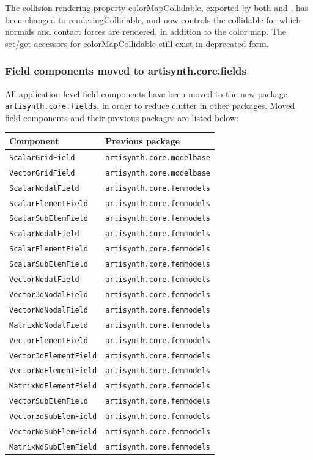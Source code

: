 \documentclass{article}
\begin{document}
The collision rendering property {\sf colorMapCollidable}, exported by both
 and
, has been
changed to {\sf renderingCollidable}, and now controls the collidable
for which normals and contact forces are rendered, in addition to the
color map. The set/get accessors for {\sf colorMapCollidable} still
exist in deprecated form.

\subsubsection{Field components moved to artisynth.core.fields}

All application-level field components have been moved to the new
package {\tt artisynth.core.fields}, in order to reduce clutter in
other packages. Moved field components and their previous
packages are listed below:

\begin{tabular}{|ll|}
\hline
Component & Previous package\\
\hline
{\tt ScalarGridField} & {\tt artisynth.core.modelbase} \\
{\tt VectorGridField} & {\tt artisynth.core.modelbase} \\
{\tt ScalarNodalField} & {\tt artisynth.core.femmodels} \\
{\tt ScalarElementField} & {\tt artisynth.core.femmodels} \\
{\tt ScalarSubElemField} & {\tt artisynth.core.femmodels} \\
{\tt ScalarNodalField} & {\tt artisynth.core.femmodels} \\
{\tt ScalarElementField} & {\tt artisynth.core.femmodels} \\
{\tt ScalarSubElemField} & {\tt artisynth.core.femmodels} \\
{\tt VectorNodalField} & {\tt artisynth.core.femmodels} \\
{\tt Vector3dNodalField} & {\tt artisynth.core.femmodels} \\
{\tt VectorNdNodalField} & {\tt artisynth.core.femmodels} \\
{\tt MatrixNdNodalField} & {\tt artisynth.core.femmodels} \\
{\tt VectorElementField} & {\tt artisynth.core.femmodels} \\
{\tt Vector3dElementField} & {\tt artisynth.core.femmodels} \\
{\tt VectorNdElementField} & {\tt artisynth.core.femmodels} \\
{\tt MatrixNdElementField} & {\tt artisynth.core.femmodels} \\
{\tt VectorSubElemField} & {\tt artisynth.core.femmodels} \\
{\tt Vector3dSubElemField} & {\tt artisynth.core.femmodels} \\
{\tt VectorNdSubElemField} & {\tt artisynth.core.femmodels} \\
{\tt MatrixNdSubElemField} & {\tt artisynth.core.femmodels}
\end{tabular}
\end{document}
